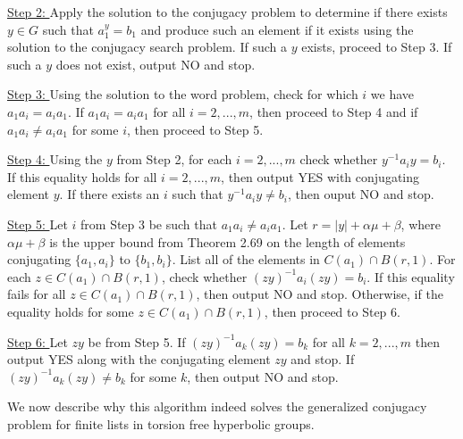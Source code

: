 \documentclass[12pt]{article}
\newcommand{\vs}{\vskip10pt}
\begin{document}
	\vs 
	
	\underline{Step 2: } Apply the solution to the conjugacy problem to determine if there exists $y \in G$ such that $a_1^y = b_1$ and produce such an element if it exists using the solution to the conjugacy search problem. If such a $y$ exists, proceed to Step 3. If such a $y$ does not exist, output NO and stop. 
	
	\vs 
	
	\underline{Step 3: } Using the solution to the word problem, check for which $i$ we have $a_1 a_i = a_i a_1$. If $a_1 a_i = a_i a_1$ for all $i = 2,...,m$, then proceed to Step 4 and if $a_1 a_i \neq a_i a_1$ for some $i$, then proceed to Step 5. 
	
	\vs
	
	\underline{Step 4: } Using the $y$ from Step 2, for each $i = 2,...,m$ check whether $y^{-1} a_i y  = b_i$. If this equality holds for all $i = 2,...,m$, then output YES with conjugating element $y$. If there exists an $i$ such that $y^{-1} a_i y \neq b_i$, then ouput NO and stop. 
	
	\vs
	
	\underline{Step 5: } Let $i$ from Step 3 be such that $a_1 a_i \neq a_i a_1$. Let $r = \vert y \vert + \alpha \mu + \beta$, where $\alpha \mu + \beta$ is the upper bound from Theorem 2.69 on the length of elements conjugating $\{a_1, a_i\}$ to $\{b_1, b_i\}$. List all of the elements in $C(a_1) \cap B(r,1)$. For each $z \in C(a_1) \cap B(r,1)$, check whether $(zy)^{-1} a_i (zy) = b_i$. If this equality fails for all $z \in C(a_1) \cap B(r,1)$, then output NO and stop. Otherwise, if the equality holds for some $z \in C(a_1) \cap B(r,1)$, then proceed to Step 6. 
	
	\vs 
	
	\underline{Step 6: } Let $zy$ be from Step 5. If $(zy)^{-1} a_k (zy) = b_k$ for all $k = 2,...,m$ then output YES along with the conjugating element $zy$ and stop. If $(zy)^{-1} a_k (zy) \neq b_k$ for some $k$, then output NO and stop. 
	
	\vs 
	
	We now describe why this algorithm indeed solves the generalized conjugacy problem for finite lists in torsion free hyperbolic groups.
	
	\vs 
	
\end{document}
